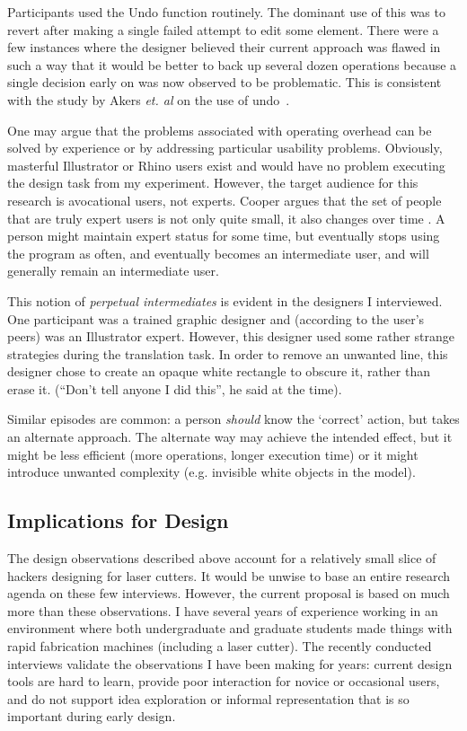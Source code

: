 \documentclass[11pt]{article}
\begin{document}
Participants used the Undo function routinely. The dominant use of
this was to revert after making a single failed attempt to edit some
element. There were a few instances where the designer believed their
current approach was flawed in such a way that it would be better to
back up several dozen operations because a single decision early on
was now observed to be problematic. This is consistent with the study
by Akers \textit{et. al} on the use of undo~\cite{akers-undo}.

One may argue that the problems associated with operating overhead can
be solved by experience or by addressing particular usability
problems. Obviously, masterful Illustrator or Rhino users exist and
would have no problem executing the design task from my
experiment. However, the target audience for this research is
avocational users, not experts. Cooper argues that the set of people
that are truly expert users is not only quite small, it also changes
over time \cite{cooper-inmates}. A person might maintain expert status
for some time, but eventually stops using the program as often, and
eventually becomes an intermediate user, and will generally remain an
intermediate user.

This notion of \textit{perpetual intermediates} is evident in the
designers I interviewed. One participant was a trained graphic
designer and (according to the user's peers) was an Illustrator
expert. However, this designer used some rather strange strategies
during the translation task. In order to remove an unwanted line, this
designer chose to create an opaque white rectangle to obscure it,
rather than erase it. (``Don't tell anyone I did this'', he said at
the time).

Similar episodes are common: a person \textit{should} know the
`correct' action, but takes an alternate approach. The alternate way
may achieve the intended effect, but it might be less efficient (more
operations, longer execution time) or it might introduce unwanted
complexity (e.g. invisible white objects in the model).

\subsection{Implications for Design}

The design observations described above account for a relatively small
slice of hackers designing for laser cutters. It would be unwise to
base an entire research agenda on these few interviews. However, the
current proposal is based on much more than these observations. I have
several years of experience working in an environment where both
undergraduate and graduate students made things with rapid fabrication
machines (including a laser cutter). The recently conducted interviews
validate the observations I have been making for years: current design
tools are hard to learn, provide poor interaction for novice or
occasional users, and do not support idea exploration or informal
representation that is so important during early design.
\end{document}
